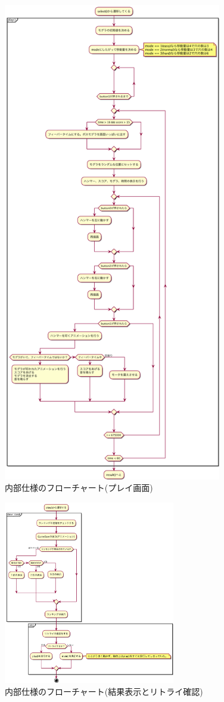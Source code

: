 \documentclass[11pt,a4j]{jsarticle}
\makeatletter
\newcommand{\figcaption}[1]{\def\@captype{figure}\caption{#1}}
\makeatother
\begin{document}
\begin{figure}[H]
  \centering
  \includegraphics[height=210mm,bb=0 0 3741 8229]{img/mogura_play.png}
  \figcaption{内部仕様のフローチャート(プレイ画面)}
  \label{fig:flow2}
\end{figure}

\begin{figure}[H]
  \centering
  \includegraphics[height=80mm,bb=0 0 3741 8229]{img/mogura_result.png}
  \figcaption{内部仕様のフローチャート(結果表示とリトライ確認)}
  \label{fig:flow3}
\end{figure}
\end{document}
